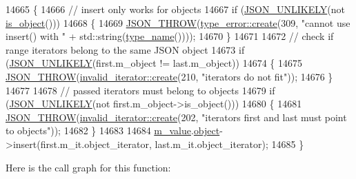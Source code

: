 \begin{DoxyCode}
14665     \{
14666         \textcolor{comment}{// insert only works for objects}
14667         \textcolor{keywordflow}{if} (\hyperlink{json_8hpp_ab77582407c64944e7db1ea95ab520253}{JSON\_UNLIKELY}(not \hyperlink{classnlohmann_1_1basic__json_af8f511af124e82e4579f444b4175787c}{is\_object}()))
14668         \{
14669             \hyperlink{json_8hpp_a6c274f6db2e65c1b66c7d41b06ad690f}{JSON\_THROW}(\hyperlink{classnlohmann_1_1detail_1_1type__error_aecc083aea4b698c33d042670ba50c10f}{type\_error::create}(309, \textcolor{stringliteral}{"cannot use insert() with "} + 
      std::string(\hyperlink{classnlohmann_1_1basic__json_a9d0a478571f82f0163b96b2424cd998f}{type\_name}())));
14670         \}
14671 
14672         \textcolor{comment}{// check if range iterators belong to the same JSON object}
14673         \textcolor{keywordflow}{if} (\hyperlink{json_8hpp_ab77582407c64944e7db1ea95ab520253}{JSON\_UNLIKELY}(first.m\_object != last.m\_object))
14674         \{
14675             \hyperlink{json_8hpp_a6c274f6db2e65c1b66c7d41b06ad690f}{JSON\_THROW}(\hyperlink{classnlohmann_1_1detail_1_1invalid__iterator_a4e849260a3caa1b288c7e619130c6c09}{invalid\_iterator::create}(210, \textcolor{stringliteral}{"iterators do not
       fit"}));
14676         \}
14677 
14678         \textcolor{comment}{// passed iterators must belong to objects}
14679         \textcolor{keywordflow}{if} (\hyperlink{json_8hpp_ab77582407c64944e7db1ea95ab520253}{JSON\_UNLIKELY}(not first.m\_object->is\_object()))
14680         \{
14681             \hyperlink{json_8hpp_a6c274f6db2e65c1b66c7d41b06ad690f}{JSON\_THROW}(\hyperlink{classnlohmann_1_1detail_1_1invalid__iterator_a4e849260a3caa1b288c7e619130c6c09}{invalid\_iterator::create}(202, \textcolor{stringliteral}{"iterators first and
       last must point to objects"}));
14682         \}
14683 
14684         \hyperlink{classnlohmann_1_1basic__json_aeb0814f76966f99290cb29e127c90a77}{m\_value}.\hyperlink{unionnlohmann_1_1basic__json_1_1json__value_a4a2209bb26e7088cd36bf24824ab5521}{object}->insert(first.m\_it.object\_iterator, last.m\_it.object\_iterator);
14685     \}
\end{DoxyCode}
Here is the call graph for this function\+:
\mbox{\label{classnlohmann_1_1basic__json_aef9ce5dd2381caee1f8ddcdb5bdd9c65}} 
